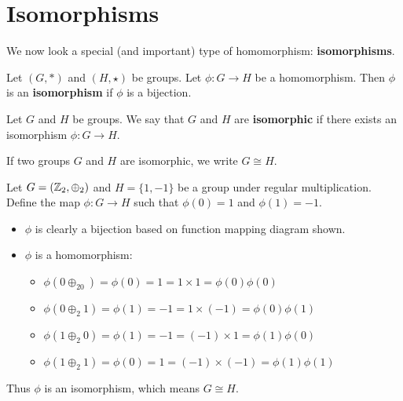 \section{Isomorphisms}
We now look a special (and important) type of homomorphism: \textbf{isomorphisms}.

\begin{definition}
    Let $(G, \ast)$ and $(H, \star)$ be groups. Let $\phi: G \to H$ be a homomorphism. Then $\phi$ is an \textbf{isomorphism} if $\phi$ is a bijection.
\end{definition}
\begin{definition}
    Let $G$ and $H$ be groups. We say that $G$ and $H$ are \textbf{isomorphic} if there exists an isomorphism $\phi: G \to H$.

    If two groups $G$ and $H$ are isomorphic, we write $G \cong H$.
\end{definition}

\begin{example}
    Let $G = (\mathbb{Z}_2, \oplus_2)$ and $H = \{1, -1\}$ be a group under regular multiplication. Define the map $\phi: G \to H$ such that $\phi(0) = 1$ and $\phi(1) = -1$.

    \begin{itemize}
        \item $\phi$ is clearly a bijection based on function mapping diagram shown.
        \begin{figure}[h]
            \centering
        \end{figure}

        \item $\phi$ is a homomorphism:\begin{itemize}
            \item $\phi(0\oplus_20) = \phi(0) = 1 = 1 \times 1 = \phi(0)\phi(0)$
            \item $\phi(0 \oplus_2 1) = \phi(1) = -1 = 1 \times (-1) = \phi(0)\phi(1)$
            \item $\phi(1 \oplus_2 0) = \phi(1) = -1 = (-1) \times 1 = \phi(1)\phi(0)$
            \item $\phi(1 \oplus_2 1) = \phi(0) = 1 = (-1) \times (-1) = \phi(1)\phi(1)$
        \end{itemize}
    \end{itemize}
    Thus $\phi$ is an isomorphism, which means $G \cong H$.
\end{example}

